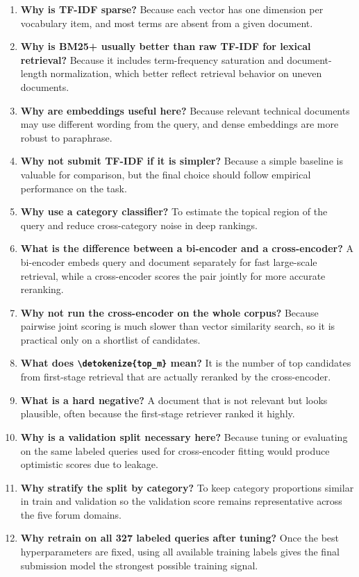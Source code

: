 \documentclass[10pt]{article}
\DeclareRobustCommand{\code}[1]{%
  \ifmmode
    \text{\nolinkurl{\detokenize{#1}}}%
  \else
    \nolinkurl{\detokenize{#1}}%
  \fi
}
\begin{document}
\begin{enumerate}
    \item \textbf{Why is TF-IDF sparse?} Because each vector has one dimension per vocabulary item, and most terms are absent from a given document.
    \item \textbf{Why is BM25+ usually better than raw TF-IDF for lexical retrieval?} Because it includes term-frequency saturation and document-length normalization, which better reflect retrieval behavior on uneven documents.
    \item \textbf{Why are embeddings useful here?} Because relevant technical documents may use different wording from the query, and dense embeddings are more robust to paraphrase.
    \item \textbf{Why not submit TF-IDF if it is simpler?} Because a simple baseline is valuable for comparison, but the final choice should follow empirical performance on the task.
    \item \textbf{Why use a category classifier?} To estimate the topical region of the query and reduce cross-category noise in deep rankings.
    \item \textbf{What is the difference between a bi-encoder and a cross-encoder?} A bi-encoder embeds query and document separately for fast large-scale retrieval, while a cross-encoder scores the pair jointly for more accurate reranking.
    \item \textbf{Why not run the cross-encoder on the whole corpus?} Because pairwise joint scoring is much slower than vector similarity search, so it is practical only on a shortlist of candidates.
    \item \textbf{What does \code{top_m} mean?} It is the number of top candidates from first-stage retrieval that are actually reranked by the cross-encoder.
    \item \textbf{What is a hard negative?} A document that is not relevant but looks plausible, often because the first-stage retriever ranked it highly.
    \item \textbf{Why is a validation split necessary here?} Because tuning or evaluating on the same labeled queries used for cross-encoder fitting would produce optimistic scores due to leakage.
    \item \textbf{Why stratify the split by category?} To keep category proportions similar in train and validation so the validation score remains representative across the five forum domains.
    \item \textbf{Why retrain on all 327 labeled queries after tuning?} Once the best hyperparameters are fixed, using all available training labels gives the final submission model the strongest possible training signal.

\end{enumerate}
\end{document}

